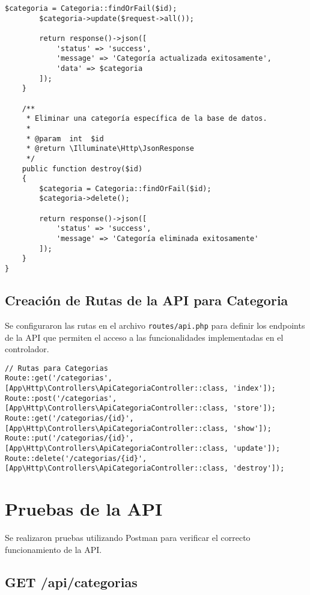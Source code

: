 \documentclass{article}
\begin{document}
\begin{lstlisting}[language=laravelPHP, caption=ApiCategoriaController]
        $categoria = Categoria::findOrFail($id);
        $categoria->update($request->all());
        
        return response()->json([
            'status' => 'success',
            'message' => 'Categoría actualizada exitosamente',
            'data' => $categoria
        ]);
    }

    /**
     * Eliminar una categoría específica de la base de datos.
     *
     * @param  int  $id
     * @return \Illuminate\Http\JsonResponse
     */
    public function destroy($id)
    {
        $categoria = Categoria::findOrFail($id);
        $categoria->delete();
        
        return response()->json([
            'status' => 'success',
            'message' => 'Categoría eliminada exitosamente'
        ]);
    }
}
\end{lstlisting}

\subsection{Creación de Rutas de la API para Categoria}

Se configuraron las rutas en el archivo \texttt{routes/api.php} para definir los endpoints de la API que permiten el acceso a las funcionalidades implementadas en el controlador.

\begin{lstlisting}[language=laravelPHP, caption=Rutas para la API de Categorías]
// Rutas para Categorias
Route::get('/categorias', [App\Http\Controllers\ApiCategoriaController::class, 'index']);
Route::post('/categorias', [App\Http\Controllers\ApiCategoriaController::class, 'store']);
Route::get('/categorias/{id}', [App\Http\Controllers\ApiCategoriaController::class, 'show']);
Route::put('/categorias/{id}', [App\Http\Controllers\ApiCategoriaController::class, 'update']);
Route::delete('/categorias/{id}', [App\Http\Controllers\ApiCategoriaController::class, 'destroy']);
\end{lstlisting}

\section{Pruebas de la API}

Se realizaron pruebas utilizando Postman para verificar el correcto funcionamiento de la API.

\subsection{GET /api/categorias}
\end{document}
